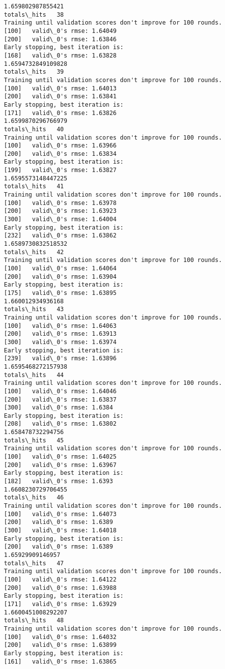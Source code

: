 \documentclass[11pt]{article}
\begin{document}
\begin{Verbatim}[commandchars=\\\{\}]
1.659802987855421
totals\_hits   38
Training until validation scores don't improve for 100 rounds.
[100]	valid\_0's rmse: 1.64049
[200]	valid\_0's rmse: 1.63846
Early stopping, best iteration is:
[168]	valid\_0's rmse: 1.63828
1.6594732849109828
totals\_hits   39
Training until validation scores don't improve for 100 rounds.
[100]	valid\_0's rmse: 1.64013
[200]	valid\_0's rmse: 1.63841
Early stopping, best iteration is:
[171]	valid\_0's rmse: 1.63826
1.6599870296766979
totals\_hits   40
Training until validation scores don't improve for 100 rounds.
[100]	valid\_0's rmse: 1.63966
[200]	valid\_0's rmse: 1.63834
Early stopping, best iteration is:
[199]	valid\_0's rmse: 1.63827
1.6595573148447225
totals\_hits   41
Training until validation scores don't improve for 100 rounds.
[100]	valid\_0's rmse: 1.63978
[200]	valid\_0's rmse: 1.63923
[300]	valid\_0's rmse: 1.64004
Early stopping, best iteration is:
[232]	valid\_0's rmse: 1.63862
1.6589730832518532
totals\_hits   42
Training until validation scores don't improve for 100 rounds.
[100]	valid\_0's rmse: 1.64064
[200]	valid\_0's rmse: 1.63904
Early stopping, best iteration is:
[175]	valid\_0's rmse: 1.63895
1.660012934936168
totals\_hits   43
Training until validation scores don't improve for 100 rounds.
[100]	valid\_0's rmse: 1.64063
[200]	valid\_0's rmse: 1.63913
[300]	valid\_0's rmse: 1.63974
Early stopping, best iteration is:
[239]	valid\_0's rmse: 1.63896
1.6595468272157938
totals\_hits   44
Training until validation scores don't improve for 100 rounds.
[100]	valid\_0's rmse: 1.64046
[200]	valid\_0's rmse: 1.63837
[300]	valid\_0's rmse: 1.6384
Early stopping, best iteration is:
[208]	valid\_0's rmse: 1.63802
1.658478732294756
totals\_hits   45
Training until validation scores don't improve for 100 rounds.
[100]	valid\_0's rmse: 1.64025
[200]	valid\_0's rmse: 1.63967
Early stopping, best iteration is:
[182]	valid\_0's rmse: 1.6393
1.6608230729706455
totals\_hits   46
Training until validation scores don't improve for 100 rounds.
[100]	valid\_0's rmse: 1.64073
[200]	valid\_0's rmse: 1.6389
[300]	valid\_0's rmse: 1.64018
Early stopping, best iteration is:
[200]	valid\_0's rmse: 1.6389
1.65929909146957
totals\_hits   47
Training until validation scores don't improve for 100 rounds.
[100]	valid\_0's rmse: 1.64122
[200]	valid\_0's rmse: 1.63988
Early stopping, best iteration is:
[171]	valid\_0's rmse: 1.63929
1.6600451008292207
totals\_hits   48
Training until validation scores don't improve for 100 rounds.
[100]	valid\_0's rmse: 1.64032
[200]	valid\_0's rmse: 1.63899
Early stopping, best iteration is:
[161]	valid\_0's rmse: 1.63865

\end{Verbatim}
\end{document}
